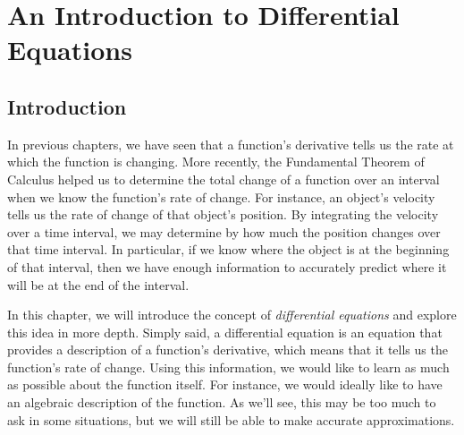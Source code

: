 \section{An Introduction to Differential Equations} \label{S:7.1.DEIntro}

\vspace*{-14 pt}

\subsection*{Introduction}

In previous chapters, we have seen that a function's derivative tells
us the rate at which the function is changing.  More recently, 
the Fundamental Theorem of Calculus helped us to determine
the total change of a function over an interval 
when we know the function's rate
of change.  For instance, an object's velocity tells us the rate of
change of that object's position.  By integrating the velocity over a
time interval, we may determine by how much the position changes over
that time interval.  In particular, if we know where the object is at the beginning
of that interval, then we have enough information to accurately
predict where it will be at the end of the interval.

In this chapter, we will introduce the concept of \emph{differential equations} and explore
this idea in more depth.  Simply said, a differential equation is an equation that provides a
description of a function's derivative, which means that it tells us
the function's rate of change.  Using this information, we would like
to learn as much as possible about the function itself.  For instance,
we would ideally like to have an algebraic description of the
function.  As we'll see, this may be too much to ask in some
situations, but we will still be able to make accurate approximations.



